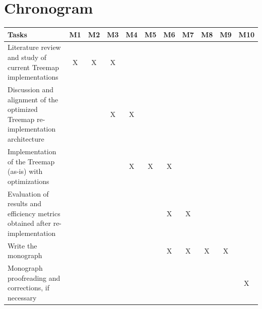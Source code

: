 \documentclass[a4paper,12pt,oneside,english,brazilian]{article}
\begin{document}
	\section{Chronogram}
	
	\begin{table}[h]
		\centering
		\small
		\begin{tabularx}{\textwidth}{|X|c|c|c|c|c|c|c|c|c|c|}
			\hline
			\textbf{Tasks} & \textbf{M1} & \textbf{M2} & \textbf{M3} & \textbf{M4} & \textbf{M5} & \textbf{M6} & \textbf{M7} & \textbf{M8} & \textbf{M9} & \textbf{M10} \\ \hline
			Literature review and study of current Treemap implementations & X & X & X & & & & & & & \\ \hline
			Discussion and alignment of the optimized Treemap re-implementation architecture & & & X & X & & & & & & \\ \hline
			Implementation of the Treemap (as-is) with optimizations & & & & X & X & X & & & & \\ \hline
			Evaluation of results and efficiency metrics obtained after re-implementation & & & & & & X & X & & & \\ \hline
			Write the monograph & & & & & & X & X & X & X & \\ \hline
			Monograph proofreading and corrections, if necessary & & & & & & & & & & X \\ \hline
		\end{tabularx}
	\end{table}
	
	
	\newpage
	\printbibliography[
	title=References, %
	]
	
\end{document}
